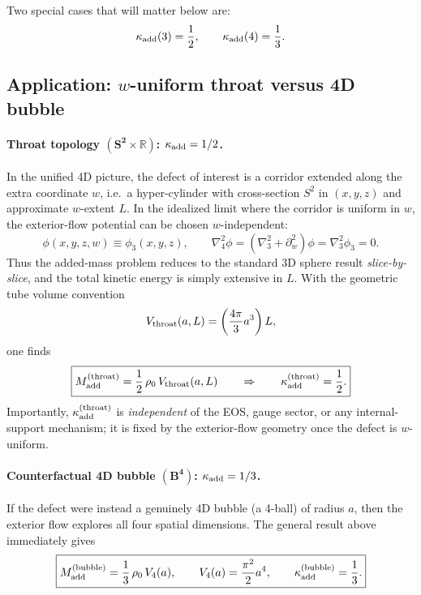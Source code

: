 \documentclass[11pt]{article}
\begin{document}
Two special cases that will matter below are:
\begin{equation}
  \kappa_{\rm add}(3)=\frac12,\qquad
  \kappa_{\rm add}(4)=\frac13.
\end{equation}

\subsection{Application: \(w\)-uniform throat versus 4D bubble}

\paragraph{Throat topology \(\boldsymbol{(S^2\times \mathbb R)}\): \(\kappa_{\rm add}=1/2\).}

In the unified 4D picture, the defect of interest is a corridor extended along the extra coordinate \(w\), i.e.\ a hyper-cylinder with cross-section \(S^2\) in \((x,y,z)\) and approximate \(w\)-extent \(L\).  In the idealized limit where the corridor is uniform in \(w\), the exterior-flow potential can be chosen \(w\)-independent:
\begin{equation}
  \phi(x,y,z,w)\equiv \phi_3(x,y,z),
  \qquad
  \nabla_4^2\phi = (\nabla_3^2 + \partial_w^2)\phi
  = \nabla_3^2\phi_3 = 0.
\end{equation}
Thus the added-mass problem reduces to the standard 3D sphere result \emph{slice-by-slice}, and the total kinetic energy is simply extensive in \(L\). With the geometric tube volume convention
\begin{equation}
  V_{\rm throat}(a,L) = \left(\frac{4\pi}{3}a^3\right)L,
\end{equation}
one finds
\begin{equation}
  \boxed{
  M_{\rm add}^{\rm(throat)}
  = \frac12\,\rho_0\,V_{\rm throat}(a,L)
  \qquad\Rightarrow\qquad
  \kappa_{\rm add}^{\rm(throat)}=\frac12.
  }
\end{equation}
Importantly, \(\kappa_{\rm add}^{\rm(throat)}\) is \emph{independent} of the EOS, gauge sector, or any internal-support mechanism; it is fixed by the exterior-flow geometry once the defect is \(w\)-uniform.

\paragraph{Counterfactual 4D bubble \(\boldsymbol{(B^4)}\): \(\kappa_{\rm add}=1/3\).}

If the defect were instead a genuinely 4D bubble (a 4-ball) of radius \(a\), then the exterior flow explores all four spatial dimensions. The general result above immediately gives
\begin{equation}
  \boxed{
  M_{\rm add}^{\rm(bubble)}
  = \frac13\,\rho_0\,V_4(a),
  \qquad
  V_4(a)=\frac{\pi^2}{2}a^4,
  \qquad
  \kappa_{\rm add}^{\rm(bubble)}=\frac13.
  }
\end{equation}
\end{document}
